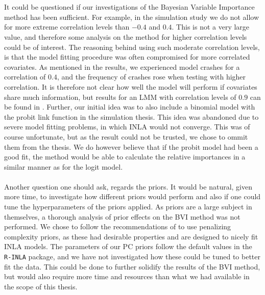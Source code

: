 \\
\\
It could be questioned if our investigations of the Bayesian Variable Importance method has been sufficient. For example, in the simulation study we do not allow for more extreme correlation levels than $-0.4$ and $0.4$. This is not a very large value, and therefore some analysis on the method for higher correlation levels could be of interest. The reasoning behind using such moderate correlation levels, is that the model fitting procedure was often compromised for more correlated covariates. As mentioned in the results, we experienced model crashes for a correlation of $0.4$, and the frequency of crashes rose when testing with higher correlation. It is therefore not clear how well the model will perform if covariates share much information, but results for an LMM with correlation levels of $0.9$ can be found in \citet{Arnstad}. Further, our initial idea was to also include a binomial model with the probit link function in the simulation thesis. This idea was abandoned due to severe model fitting problems, in which INLA would not converge. This was of course unfortunate, but as the result could not be trusted, we chose to ommit them from the thesis. We do however believe that if the probit model had been a good fit, the method would be able to calculate the relative importances in a similar manner as for the logit model. 
\\
\\
Another question one should ask, regards the priors. It would be natural, given more time, to investigate how different priors would perform and also if one could tune the hyperparameters of the priors applied. As priors are a large subject in themselves, a thorough analysis of prior effects on the BVI method was not performed. We chose to follow the recommendations of \citet{simpson2017penalising} to use penalizing complexity priors, as these had desirable properties and are designed to nicely fit INLA models. The parameters of our PC priors follow the default values in the \texttt{R-INLA} package, and we have not investigated how these could be tuned to better fit the data. This could be done to further solidify the results of the BVI method, but would also require more time and resources than what we had available in the scope of this thesis. 





